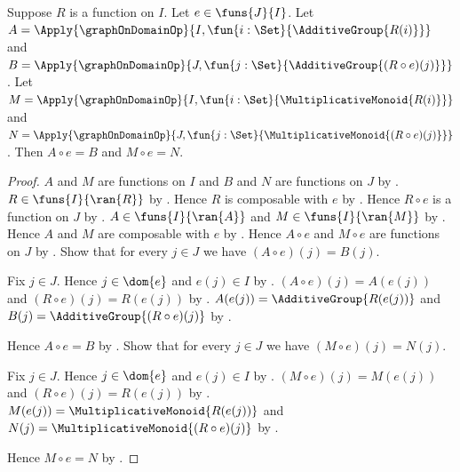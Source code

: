 \begin{proposition}\label{product_ring_reduct_families_reindex}
    Suppose $R$ is a function on $I$.
    Let $e\in\funs{J}{I}$.
    Let
        $A=\Apply{\graphOnDomainOp}{
            I,\fun{i:\Set}{\AdditiveGroup{R(i)}}}$ and
        $B=\Apply{\graphOnDomainOp}{
            J,\fun{j:\Set}{\AdditiveGroup{(R\circ e)(j)}}}$.
    Let
        $M=\Apply{\graphOnDomainOp}{
            I,\fun{i:\Set}{\MultiplicativeMonoid{R(i)}}}$ and
        $N=\Apply{\graphOnDomainOp}{
            J,\fun{j:\Set}{\MultiplicativeMonoid{(R\circ e)(j)}}}$.
    Then $A\circ e=B$ and $M\circ e=N$.
\end{proposition}
\begin{proof}
    $A$ and $M$ are functions on $I$ and
        $B$ and $N$ are functions on $J$ by
        .
    $R\in\funs{I}{\ran{R}}$ by
        .
    Hence $R$ is composable with $e$ by .
    Hence $R\circ e$ is a function on $J$ by
        .
    $A\in\funs{I}{\ran{A}}$ and $M\in\funs{I}{\ran{M}}$ by
        .
    Hence $A$ and $M$ are composable with $e$ by
        .
    Hence $A\circ e$ and $M\circ e$ are functions on $J$ by
        .
    Show that for every $j\in J$ we have $(A\circ e)(j)=B(j)$.
    \begin{subproof}
        Fix $j\in J$.
        Hence $j\in\dom{e}$ and $e(j)\in I$ by
            .
        $(A\circ e)(j)=A(e(j))$ and
            $(R\circ e)(j)=R(e(j))$ by
            .
        $A(e(j))=\AdditiveGroup{R(e(j))}$ and
            $B(j)=\AdditiveGroup{(R\circ e)(j)}$ by
            .
    \end{subproof}
    Hence $A\circ e=B$ by .
    Show that for every $j\in J$ we have $(M\circ e)(j)=N(j)$.
    \begin{subproof}
        Fix $j\in J$.
        Hence $j\in\dom{e}$ and $e(j)\in I$ by
            .
        $(M\circ e)(j)=M(e(j))$ and
            $(R\circ e)(j)=R(e(j))$ by
            .
        $M(e(j))=\MultiplicativeMonoid{R(e(j))}$ and
            $N(j)=\MultiplicativeMonoid{(R\circ e)(j)}$ by
            .
    \end{subproof}
    Hence $M\circ e=N$ by .
\end{proof}

